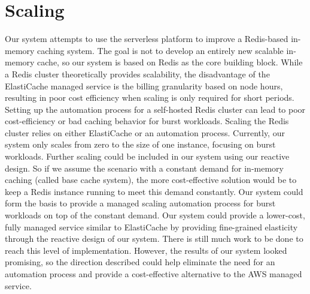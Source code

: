 \section{Scaling}
\label{sec:scaling}
Our system attempts to use the serverless platform to improve a Redis-based in-memory caching system. The goal is not to develop an entirely new scalable in-memory cache, so our system is based on Redis as the core building block. While a Redis cluster theoretically provides scalability, the disadvantage of the ElastiCache managed service is the billing granularity based on node hours, resulting in poor cost efficiency when scaling is only required for short periods. Setting up the automation process for a self-hosted Redis cluster can lead to poor cost-efficiency or bad caching behavior for burst workloads. Scaling the Redis cluster relies on either ElastiCache or an automation process. Currently, our system only scales from zero to the size of one instance, focusing on burst workloads. Further scaling could be included in our system using our reactive design. So if we assume the scenario with a constant demand for in-memory caching (called base cache system), the more cost-effective solution would be to keep a Redis instance running to meet this demand constantly. Our system could form the basis to provide a managed scaling automation process for burst workloads on top of the constant demand. Our system could provide a lower-cost, fully managed service similar to ElastiCache by providing fine-grained elasticity through the reactive design of our system. There is still much work to be done to reach this level of implementation. However, the results of our system looked promising, so the direction described could help eliminate the need for an automation process and provide a cost-effective alternative to the AWS managed service.

